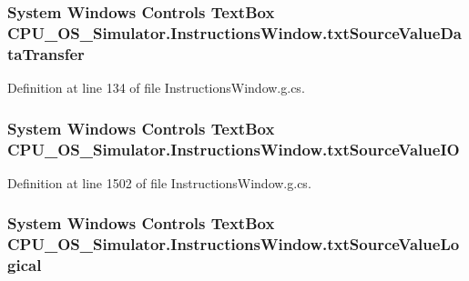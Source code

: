\subsubsection[{txt\+Source\+Value\+Data\+Transfer}]{\setlength{\rightskip}{0pt plus 5cm}System Windows Controls Text\+Box C\+P\+U\+\_\+\+O\+S\+\_\+\+Simulator.\+Instructions\+Window.\+txt\+Source\+Value\+Data\+Transfer\hspace{0.3cm}{\ttfamily [package]}}\label{class_c_p_u___o_s___simulator_1_1_instructions_window_a44cd8a2732d939d1746051f8b2093500}


Definition at line 134 of file Instructions\+Window.\+g.\+cs.

\hypertarget{class_c_p_u___o_s___simulator_1_1_instructions_window_a14161b7bebd71e7545b59f77f6254a26}{}
\subsubsection[{txt\+Source\+Value\+I\+O}]{\setlength{\rightskip}{0pt plus 5cm}System Windows Controls Text\+Box C\+P\+U\+\_\+\+O\+S\+\_\+\+Simulator.\+Instructions\+Window.\+txt\+Source\+Value\+I\+O\hspace{0.3cm}{\ttfamily [package]}}\label{class_c_p_u___o_s___simulator_1_1_instructions_window_a14161b7bebd71e7545b59f77f6254a26}


Definition at line 1502 of file Instructions\+Window.\+g.\+cs.

\hypertarget{class_c_p_u___o_s___simulator_1_1_instructions_window_afac2309550dd6f1f1589dc7451e8f878}{}
\subsubsection[{txt\+Source\+Value\+Logical}]{\setlength{\rightskip}{0pt plus 5cm}System Windows Controls Text\+Box C\+P\+U\+\_\+\+O\+S\+\_\+\+Simulator.\+Instructions\+Window.\+txt\+Source\+Value\+Logical\hspace{0.3cm}{\ttfamily [package]}}\label{class_c_p_u___o_s___simulator_1_1_instructions_window_afac2309550dd6f1f1589dc7451e8f878}


